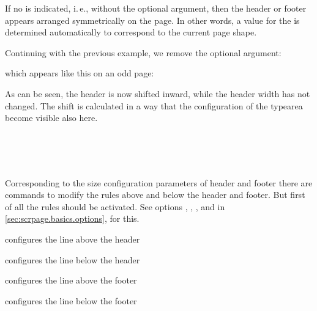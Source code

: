 If no  is indicated, i.\,e., without the optional argument,
then the header or footer appears arranged symmetrically on the page.
In other words, a value for the  is determined
automatically to correspond to the current page shape.
%
\begin{Example}
  Continuing with the previous example, we remove the optional
  argument:
\begin{lstcode}
\end{lstcode}
%
  which appears like this on an odd page:
%
  \begin{XmpTopPage}
    \thinlines{}
  \end{XmpTopPage}
\end{Example}

As can be seen, the header is now shifted inward, while the header
width has not changed. The shift is calculated in a way that the
configuration of the typearea become visible also here.%
%

\begin{Declaration}
                        \\
                        \\
                        \\
\end{Declaration}%
%
%
Corresponding to the size configuration parameters of header and
footer there are commands to modify the rules above and below the
header and footer. But first of all the rules should be activated. See options  
, ,
, and  in
\autoref{sec:scrpage.basics.options},
 for this.

\begin{labeling}[\,--]{}
\item[\Macro{setheadtopline}] configures the line above the header
\item[\Macro{setheadsepline}] configures the line below the header
\item[\Macro{setfootsepline}] configures the line above the footer
\item[\Macro{setfootbotline}] configures the line below the footer
\end{labeling}

